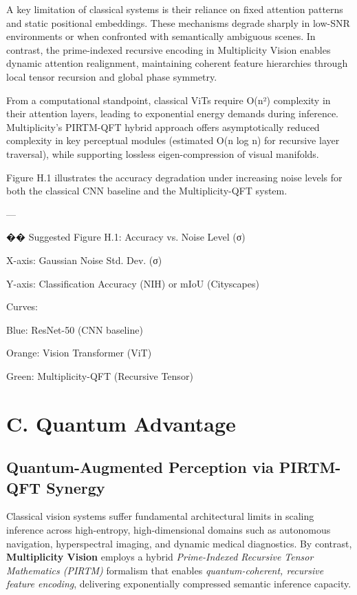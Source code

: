 \documentclass[12pt]{article}
\theoremstyle{plain}
\begin{document}
A key limitation of classical systems is their reliance on fixed attention patterns and static positional embeddings. These mechanisms degrade sharply in low-SNR environments or when confronted with semantically ambiguous scenes. In contrast, the prime-indexed recursive encoding in Multiplicity Vision enables dynamic attention realignment, maintaining coherent feature hierarchies through local tensor recursion and global phase symmetry.

From a computational standpoint, classical ViTs require O(n²) complexity in their attention layers, leading to exponential energy demands during inference. Multiplicity’s PIRTM-QFT hybrid approach offers asymptotically reduced complexity in key perceptual modules (estimated O(n log n) for recursive layer traversal), while supporting lossless eigen-compression of visual manifolds.

Figure H.1 illustrates the accuracy degradation under increasing noise levels for both the classical CNN baseline and the Multiplicity-QFT system.

—

�� Suggested Figure H.1: Accuracy vs. Noise Level (σ)

X-axis: Gaussian Noise Std. Dev. (σ)

Y-axis: Classification Accuracy (NIH) or mIoU (Cityscapes)

Curves:

Blue: ResNet-50 (CNN baseline)

Orange: Vision Transformer (ViT)

Green: Multiplicity-QFT (Recursive Tensor)


\section*{C. Quantum Advantage}

\subsection*{Quantum-Augmented Perception via PIRTM-QFT Synergy}

Classical vision systems suffer fundamental architectural limits in scaling inference across high-entropy, high-dimensional domains such as autonomous navigation, hyperspectral imaging, and dynamic medical diagnostics. By contrast, \textbf{Multiplicity Vision} employs a hybrid \textit{Prime-Indexed Recursive Tensor Mathematics (PIRTM)} formalism that enables \textit{quantum-coherent, recursive feature encoding}, delivering exponentially compressed semantic inference capacity.
\end{document}
